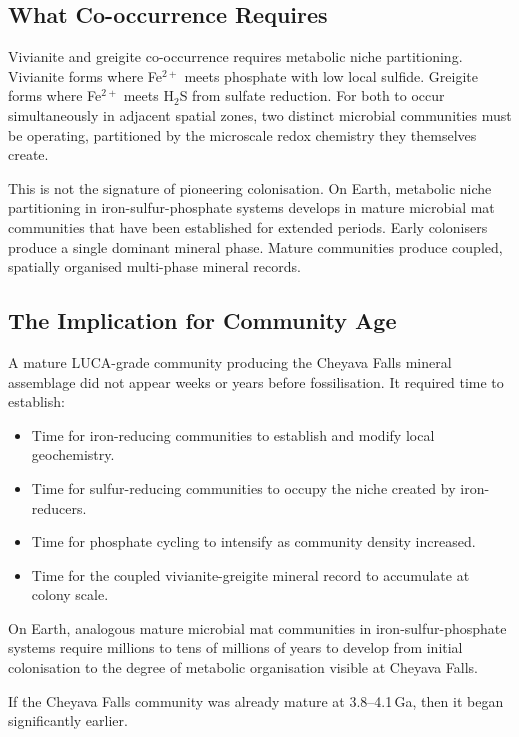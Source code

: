 \documentclass[11pt, a4paper]{article}
\begin{document}
\subsection{What Co-occurrence Requires}

Vivianite and greigite co-occurrence requires
metabolic niche partitioning.
Vivianite forms where Fe$^{2+}$ meets phosphate
with low local sulfide.
Greigite forms where Fe$^{2+}$ meets H$_2$S
from sulfate reduction.
For both to occur simultaneously in adjacent
spatial zones, two distinct microbial communities
must be operating, partitioned by the
microscale redox chemistry they themselves create.

This is not the signature of pioneering
colonisation.
On Earth, metabolic niche partitioning in
iron-sulfur-phosphate systems develops in
mature microbial mat communities that have
been established for extended periods.
Early colonisers produce a single dominant
mineral phase.
Mature communities produce coupled, spatially
organised multi-phase mineral records.

\subsection{The Implication for Community Age}

A mature LUCA-grade community producing the
Cheyava Falls mineral assemblage did not
appear weeks or years before fossilisation.
It required time to establish:

\begin{itemize}[leftmargin=*]
\item Time for iron-reducing communities
  to establish and modify local geochemistry.
\item Time for sulfur-reducing communities
  to occupy the niche created by iron-reducers.
\item Time for phosphate cycling to intensify
  as community density increased.
\item Time for the coupled vivianite-greigite
  mineral record to accumulate at
  colony scale.
\end{itemize}

On Earth, analogous mature microbial mat
communities in iron-sulfur-phosphate systems
require millions to tens of millions of years
to develop from initial colonisation to
the degree of metabolic organisation
visible at Cheyava Falls.

If the Cheyava Falls community was already
mature at 3.8--4.1\,Ga, then it began
significantly earlier.
\end{document}
